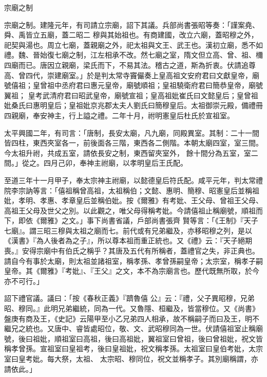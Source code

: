 
\begin{pinyinscope}

 宗廟之制



 宗廟之制。建隆元年，有司請立宗廟，詔下其議。兵部尚書張昭等奏：「謹案堯、舜、禹皆立五廟，蓋二昭二
 穆與其始祖也。有商建國，改立六廟，蓋昭穆之外，祀契與湯也。周立七廟，蓋親廟之外，祀太祖與文王、武王也。漢初立廟，悉不如禮。魏、晉始復七廟之制，江左相承不改。然七廟之室，隋文但立高、曾、祖、檷四廟而已。唐因立親廟，梁氏而下，不易其法。稽古之道，斯為折衷。伏請追尊高、曾四代，崇建廟室。」於是判太常寺竇儼奏上皇高祖文安府君曰文獻皇帝，廟號僖祖；皇曾祖中丞府君曰惠元皇帝，廟號順祖；皇祖驍衛府君曰簡恭皇帝，廟號翼祖；
 皇考武清府君曰昭武皇帝，廟號宣祖；皇高祖妣崔氏曰文懿皇后；皇曾祖妣桑氏曰惠明皇后；皇祖妣京兆郡太夫人劉氏曰簡穆皇后。太祖御崇元殿，備禮冊四親廟，奉安神主，行上謚之禮。二年十月，祔明憲皇后杜氏於宣祖室。



 太平興國二年，有司言：「唐制，長安太廟，凡九廟，同殿異室。其制：二十一間皆四柱，東西夾室各一，前後面各三階，東西各二側階。本朝太廟四室，室三間。今太祖升祔，共成五室，請依長安之制，東西留夾室外，
 餘十間分為五室，室二間。」從之。四月己卯，奉神主祔廟，以孝明皇后王氏配。



 至道三年十一月甲子，奉太宗神主祔廟，以懿德皇后符氏配。咸平元年，判太常禮院李宗訥等言：「僖祖稱曾高祖，太祖稱伯；文懿、惠明、簡穆、昭憲皇后並稱祖妣，孝明、孝惠、孝章皇后並稱伯妣。按《爾雅》有考妣、王父母、曾祖王父母、高祖王父母及世父之別。以此觀之，唯父母得稱考妣。今請僖祖止稱廟號，順祖而下，即依《爾雅》之文。」事下尚書省議，戶部尚書張齊
 賢等言：「《王制》『天子七廟』。謂三昭三穆與太祖之廟而七。前代或有兄弟繼及，亦移昭穆之列，是以《漢書》『為人後者為之子』，所以尊本祖而重正統也。又《禮》云：『天子絕期喪。』安得宗廟中有伯氏之稱乎？其唐及五代有所稱者，蓋禮官之失，非正典也。請自今有事於太廟，則太祖並諸祖室，稱孝孫、孝曾孫嗣皇帝；太宗室，稱孝子嗣皇帝。其《爾雅》『考妣』、『王父』之文，本不為宗廟言也。歷代既無所取，於今亦不可行。」



 詔下禮官議。議曰：「按《春秋正義》『躋魯僖
 公』云：『禮，父子異昭穆，兄弟昭、穆同。』此明兄弟繼統，同為一代。又魯隱、桓繼及，皆當穆位。又《尚書》盤庚有商及王，《史記》云陽甲至小乙兄弟四人相承，故不稱嗣子而曰及王，明不繼兄之統也。又唐中、睿皆處昭位，敬、文、武昭穆同為一世。伏請僖祖室止稱廟號，後曰祖妣，順祖室曰高祖，後曰高祖妣，翼祖室曰曾祖，後曰曾祖妣，祝文皆稱孝曾孫。宣祖室曰皇祖考，後曰皇祖妣，祝文稱孝孫。太祖室曰皇伯考妣，太宗室曰皇考妣。每大祭，太祖、
 太宗昭、穆同位，祝文並稱孝子。其別廟稱謂，亦請依此。」




\end{pinyinscope}

